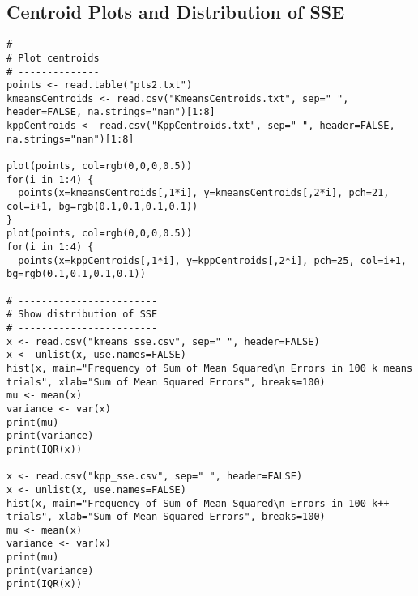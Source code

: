 \subsection {Centroid Plots and Distribution of SSE}
\begin{verbatim}
# --------------
# Plot centroids
# --------------
points <- read.table("pts2.txt")
kmeansCentroids <- read.csv("KmeansCentroids.txt", sep=" ", header=FALSE, na.strings="nan")[1:8]
kppCentroids <- read.csv("KppCentroids.txt", sep=" ", header=FALSE, na.strings="nan")[1:8]

plot(points, col=rgb(0,0,0,0.5))
for(i in 1:4) {
  points(x=kmeansCentroids[,1*i], y=kmeansCentroids[,2*i], pch=21, col=i+1, bg=rgb(0.1,0.1,0.1,0.1))
}
plot(points, col=rgb(0,0,0,0.5))
for(i in 1:4) {
  points(x=kppCentroids[,1*i], y=kppCentroids[,2*i], pch=25, col=i+1, bg=rgb(0.1,0.1,0.1,0.1))

# ------------------------
# Show distribution of SSE
# ------------------------
x <- read.csv("kmeans_sse.csv", sep=" ", header=FALSE)
x <- unlist(x, use.names=FALSE)
hist(x, main="Frequency of Sum of Mean Squared\n Errors in 100 k means trials", xlab="Sum of Mean Squared Errors", breaks=100)
mu <- mean(x)
variance <- var(x)
print(mu)
print(variance)
print(IQR(x))

x <- read.csv("kpp_sse.csv", sep=" ", header=FALSE)
x <- unlist(x, use.names=FALSE)
hist(x, main="Frequency of Sum of Mean Squared\n Errors in 100 k++ trials", xlab="Sum of Mean Squared Errors", breaks=100)
mu <- mean(x)
variance <- var(x)
print(mu)
print(variance)
print(IQR(x))
\end{verbatim}
